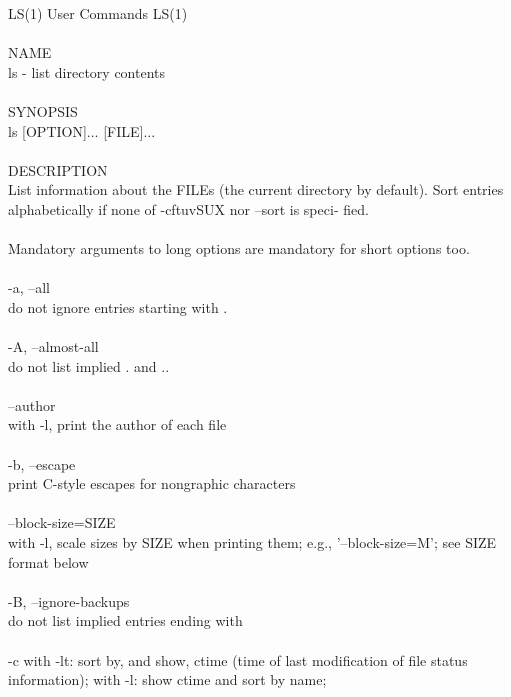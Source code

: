 \documentclass{article}
\begin{document}
LS(1)                            User Commands                           LS(1) \\
\\
NAME \\
       ls - list directory contents \\
\\
SYNOPSIS \\
       ls [OPTION]... [FILE]... \\
\\
DESCRIPTION \\
\tabto{1cm}      List  information  about  the FILEs (the current directory by default).
\tabto{1cm}       Sort entries alphabetically if none of -cftuvSUX nor --sort  is  speci‐
\tabto{1cm}       fied. \\
\\
 \tabto{1cm}      Mandatory  arguments  to  long  options are mandatory for short options
       too. \\
\\
\tabto{1cm}       -a, --all\\
\tabto{1cm}              do not ignore entries starting with .\\
\\
\tabto{1cm}       -A, --almost-all\\
\tabto{2cm}              do not list implied . and .. \\
\\
 \tabto{1cm}      --author \\
 \tabto{2cm}             with -l, print the author of each file \\
\\
\tabto{1cm}      -b, --escape \\
\tabto{2cm}              print C-style escapes for nongraphic characters \\
\\
\tabto{1cm}       --block-size=SIZE \\
\tabto{2cm}              with  -l,  scale  sizes  by  SIZE  when  printing  them;   e.g.,
              '--block-size=M'; see SIZE format below \\
\\
\tabto{1cm}       -B, --ignore-backups \\
\tabto{2cm}              do not list implied entries ending with ~ \\
\\
\tabto{1cm}       -c     with -lt: sort by, and show, ctime (time of last modification of
\tabto{2cm}              file status information); with -l: show ctime and sort by  name;
\end{document}
